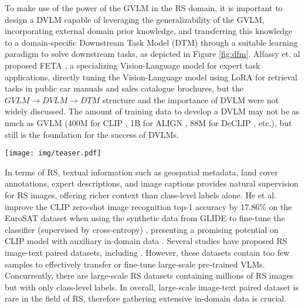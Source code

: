 \documentclass[journal]{IEEEtran}
\begin{document}
To make use of the power of the GVLM in the RS domain, it is important to design a DVLM capable of leveraging the generalizability of the GVLM, incorporating external domain prior knowledge, and transferring this knowledge to a domain-specific Downstream Task Model (DTM) through a suitable learning paradigm to solve downstream tasks, as depicted in Figure \ref{fig:dfm}. Alfassy et. al proposed FETA \cite{alfassy2022feta}, a specializing Vision-Language model for expert task applications, directly tuning the Vision-Language model using LoRA for retrieval tasks in public car manuals and sales catalogue brochures, but the $GVLM \xrightarrow{} DVLM \xrightarrow{} DTM$ structure and the importance of DVLM were not widely discussed. The amount of training data to develop a DVLM may not be as much as GVLM (400M for CLIP \cite{clip}, 1B for ALIGN \cite{align}, 88M for DeCLIP \cite{declip}, etc.), but still is the foundation for the success of DVLMs. 

\begin{figure*}
    \centering
\texttt{[image: img/teaser.pdf]}
    \caption{Illustration of our proposed Framework. The Domain Vision-Language Model (DVLM) plays a central role in accepting the general knowledge from the General Vision-Language Model (GVLM) and is injected with massive domain-specific knowledge from external data. With the proper learning paradigm, DVLM is able to transfer the general knowledge with domain-specific prior to the Downstream Task Model (DTM) for domain-specific tasks. A demo for our proposed RS5M dataset is on the left.}
    \label{fig:dfm}
\end{figure*}

In terms of RS, textual information such as geospatial metadata, land cover annotations, expert descriptions, and image captions provides natural supervision for RS images, offering richer context than class-level labels alone. He et al. improve the CLIP zero-shot image recognition top-1 accuracy by 17.86\% on the EuroSAT dataset when using the synthetic data from GLIDE to fine-tune the classifier (supervised by cross-entropy) \cite{wortsman2022robust}, presenting a promising potential on CLIP model with auxiliary in-domain data \cite{synthetic}. Several studies have proposed RS image-text paired datasets, including \cite{UCMSydeney} \cite{UCMSydeney} \cite{RSICD} \cite{RSITMD} \cite{rsvg}. However, these datasets contain too few samples to effectively transfer or fine-tune large-scale pre-trained VLMs. Concurrently, there are large-scale RS datasets \cite{millionaid} \cite{ben} \cite{fmow} containing millions of RS images but with only class-level labels. In overall, large-scale image-text paired dataset is rare in the field of RS, therefore gathering extensive in-domain data is crucial. 
\end{document}
